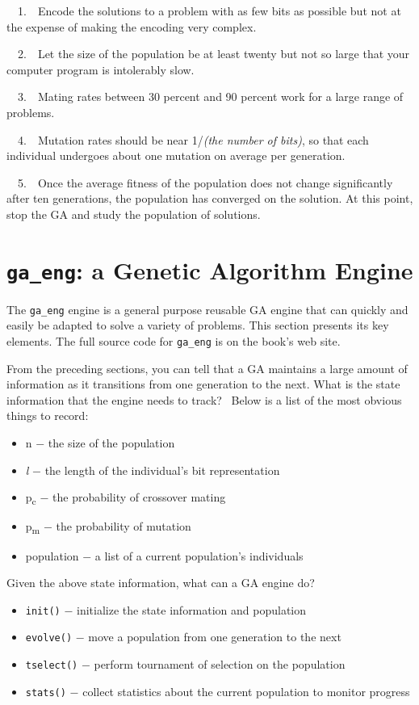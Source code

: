 \ \ 1.\ \ Encode the solutions to a problem with as few bits as possible
but not at the expense of making the encoding very complex. 

\ \ 2.\ \ Let the size of the population be at least twenty but not so
large that your computer program is intolerably slow. 

\ \ 3.\ \ Mating rates between 30 percent and 90 percent work for a
large range of problems.

\ \ 4.\ \ Mutation rates should be near 1/\textit{(the number of bits)},
so that each
individual undergoes about one mutation on average per generation.

\ \ 5.\ \ Once the average fitness of the population does not change
significantly after ten generations, the population has converged on
the solution. At this point, stop the GA and study the population of
solutions.


\section{\texttt{ga\_eng}: a Genetic Algorithm Engine}

The \texttt{ga\_eng} engine is a general purpose reusable GA engine that
can quickly and easily be adapted to solve a variety of problems. This
section presents its key elements. The full source
code for \texttt{ga\_eng} is on the book's web site.

From the preceding sections, you can tell that a GA maintains a large
amount of information as it transitions from one generation to the
next. What is the state information that the engine needs to track?
\ Below is a list of the most obvious things to record:

\begin{itemize}
\item n $-$ the size of the population
\item \textit{l} $-$ the length of the individual's bit
representation
\item p\textsubscript{c} $-$ the probability of crossover mating
\item p\textsubscript{m} $-$ the probability of mutation
\item population $-$ a list of a current population's
individuals
\end{itemize}
Given the above state information, what can a GA engine do?

\begin{itemize}
\item \texttt{init()} $-$ initialize the state information and
population
\item \texttt{evolve()} $-$ move a population from one generation to the
next
\item \texttt{tselect()} $-$ perform tournament of selection on the
population
\item \texttt{stats()} $-$ collect statistics about the current
population to monitor progress
\end{itemize}


